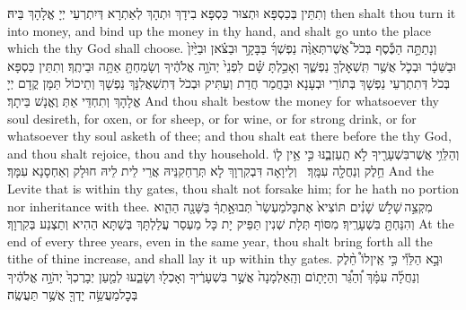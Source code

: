 {וְתִתֵּין בְּכַסְפָּא וּתְצוּר כַּסְפָּא בִידָךְ וּתְהָךְ לְאַתְרָא דְּיִתְרְעֵי יְיָ אֱלָהָךְ בֵּיהּ׃}
{then shalt thou turn it into money, and bind up the money in thy hand, and shalt go unto the place which the \lord\space thy God shall choose.}{}
{וְנָתַתָּ֣ה הַכֶּ֡סֶף בְּכֹל֩ אֲשֶׁר\maqqaf תְּאַוֶּ֨ה נַפְשְׁךָ֜ בַּבָּקָ֣ר וּבַצֹּ֗אן וּבַיַּ֙יִן֙ וּבַשֵּׁכָ֔ר וּבְכֹ֛ל אֲשֶׁ֥ר תִּֽשְׁאׇלְךָ֖ נַפְשֶׁ֑ךָ וְאָכַ֣לְתָּ שָּׁ֗ם לִפְנֵי֙ יְהֹוָ֣ה אֱלֹהֶ֔יךָ וְשָׂמַחְתָּ֖ אַתָּ֥ה וּבֵיתֶֽךָ׃}
{וְתִתֵּין כַּסְפָּא בְּכֹל דְּתִתְרְעֵי נַפְשָׁךְ בְּתוֹרֵי וּבְעָנָא וּבַחֲמַר חֲדַת וְעַתִּיק וּבְכֹל דְּתִשְׁאֲלִנָּךְ נַפְשָׁךְ וְתֵיכוֹל תַּמָּן קֳדָם יְיָ אֱלָהָךְ וְתִחְדֵּי אַתְּ וֶאֱנָשׁ בֵּיתָךְ׃}
{And thou shalt bestow the money for whatsoever thy soul desireth, for oxen, or for sheep, or for wine, or for strong drink, or for whatsoever thy soul asketh of thee; and thou shalt eat there before the \lord\space thy God, and thou shalt rejoice, thou and thy household.}{}
{וְהַלֵּוִ֥י אֲשֶׁר\maqqaf בִּשְׁעָרֶ֖יךָ לֹ֣א תַֽעַזְבֶ֑נּוּ כִּ֣י אֵ֥ין ל֛וֹ חֵ֥לֶק וְנַחֲלָ֖ה עִמָּֽךְ׃ \setuma }
{וְלֵיוָאָה דִּבְקִרְוָךְ לָא תְּרַחַקִנֵּיהּ אֲרֵי לֵית לֵיהּ חוּלָק וְאַחְסָנָא עִמָּךְ׃}
{And the Levite that is within thy gates, thou shalt not forsake him; for he hath no portion nor inheritance with thee.}{}
{מִקְצֵ֣ה \legarmeh  שָׁלֹ֣שׁ שָׁנִ֗ים תּוֹצִיא֙ אֶת\maqqaf כׇּל\maqqaf מַעְשַׂר֙ תְּבוּאָ֣תְךָ֔ בַּשָּׁנָ֖ה הַהִ֑וא וְהִנַּחְתָּ֖ בִּשְׁעָרֶֽיךָ׃}
{מִסּוֹף תְּלָת שְׁנִין תַּפֵּיק יָת כָּל מַעְסַר עֲלַלְתָּךְ בְּשַׁתָּא הַהִיא וְתַצְנַע בְּקִרְוָךְ׃}
{At the end of every three years, even in the same year, thou shalt bring forth all the tithe of thine increase, and shall lay it up within thy gates.}{}
{וּבָ֣א הַלֵּוִ֡י כִּ֣י אֵֽין\maqqaf לוֹ֩ חֵ֨לֶק וְנַחֲלָ֜ה עִמָּ֗ךְ וְ֠הַגֵּ֠ר וְהַיָּת֤וֹם וְהָֽאַלְמָנָה֙ אֲשֶׁ֣ר בִּשְׁעָרֶ֔יךָ וְאָכְל֖וּ וְשָׂבֵ֑עוּ לְמַ֤עַן יְבָרֶכְךָ֙ יְהֹוָ֣ה אֱלֹהֶ֔יךָ בְּכׇל\maqqaf מַעֲשֵׂ֥ה יָדְךָ֖ אֲשֶׁ֥ר תַּעֲשֶֽׂה׃ \setuma }

